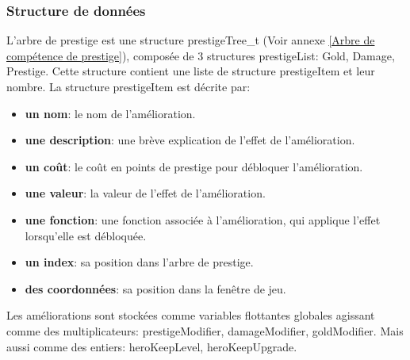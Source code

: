 \documentclass[11pt,a4paper]{article}
\begin{document}
\subsubsection{Structure de données}
L’arbre de prestige est une structure prestigeTree\_t (Voir annexe \ref{Arbre de compétence de prestige}), composée de 3 structures prestigeList: Gold, Damage, Prestige. Cette structure contient une liste de structure prestigeItem et leur nombre.
La structure prestigeItem est décrite par:
\begin{itemize}
    \item \textbf{un nom}: le nom de l'amélioration.
    \item \textbf{une description}: une brève explication de l'effet de l'amélioration.
    \item \textbf{un coût}: le coût en points de prestige pour débloquer l'amélioration.
    \item \textbf{une valeur}: la valeur de l'effet de l'amélioration.
    \item \textbf{une fonction}: une fonction associée à l'amélioration, qui applique l'effet lorsqu'elle est débloquée.
    \item \textbf{un index}: sa position dans l'arbre de prestige.
    \item \textbf{des coordonnées}: sa position dans la fenêtre de jeu.
\end{itemize}
Les améliorations sont stockées comme variables flottantes globales agissant comme des multiplicateurs: prestigeModifier, damageModifier, goldModifier. Mais aussi comme des entiers: heroKeepLevel, heroKeepUpgrade.
\end{document}
